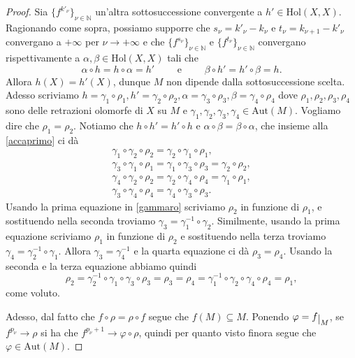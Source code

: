 \begin{proof}
    Sia $\{f^{k'_\nu}\}_{\nu\in\mathbb{N}}$ un'altra sottosuccessione convergente a $h'\in\text{Hol}(X,X)$. Ragionando come sopra, possiamo supporre che $s_\nu=k'_\nu-k_\nu$ e $t_\nu=k_{\nu+1}-k'_\nu$ convergano a $+\infty$ per $\nu\longrightarrow+\infty$ e che $\{f^{s_\nu}\}_{\nu\in\mathbb{N}}$ e $\{f^{t_\nu}\}_{\nu\in\mathbb{N}}$ convergano rispettivamente a $\alpha,\beta \in \text{Hol}(X,X)$ tali che
    \begin{equation}\label{accaprimo}
        \alpha\circ h=h\circ\alpha=h' \qquad\text{ e }\qquad \beta\circ h'=h'\circ\beta=h.
    \end{equation}
    Allora $h(X)=h'(X)$, dunque $M$ non dipende dalla sottosuccessione scelta. Adesso scriviamo $h=\gamma_1\circ\rho_1,h'=\gamma_2\circ\rho_2,\alpha=\gamma_3\circ\rho_3,\beta=\gamma_4\circ\rho_4$ dove $\rho_1,\rho_2,\rho_3,\rho_4$ sono delle retrazioni olomorfe di $X$ su $M$ e $\gamma_1,\gamma_2,\gamma_3,\gamma_4\in\text{Aut}(M)$. Vogliamo dire che $\rho_1=\rho_2$. Notiamo che $h\circ h'=h'\circ h$ e $\alpha\circ\beta=\beta\circ\alpha$, che insieme alla \eqref{accaprimo} ci dà
    \begin{equation}\label{gammaro}\begin{split}
        \gamma_1\circ\gamma_2\circ\rho_2=\gamma_2\circ\gamma_1\circ\rho_1,\\
        \gamma_3\circ\gamma_1\circ\rho_1=\gamma_1\circ\gamma_3\circ\rho_3=\gamma_2\circ\rho_2,\\
        \gamma_4\circ\gamma_2\circ\rho_2=\gamma_2\circ\gamma_4\circ\rho_4=\gamma_1\circ\rho_1,\\
        \gamma_3\circ\gamma_4\circ\rho_4=\gamma_4\circ\gamma_3\circ\rho_3.
    \end{split}\end{equation}
    Usando la prima equazione in \eqref{gammaro} scriviamo $\rho_2$ in funzione di $\rho_1$, e sostituendo nella seconda troviamo $\gamma_3=\gamma_1^{-1}\circ\gamma_2$. Similmente, usando la prima equazione scriviamo $\rho_1$ in funzione di $\rho_2$ e sostituendo nella terza troviamo $\gamma_4=\gamma_2^{-1}\circ\gamma_1$. Allora $\gamma_3=\gamma_4^{-1}$ e la quarta equazione ci dà $\rho_3=\rho_4$. Usando la seconda e la terza equazione abbiamo quindi
    $$\rho_2=\gamma_2^{-1}\circ\gamma_1\circ\gamma_3\circ\rho_3=\rho_3=\rho_4=\gamma_1^{-1}\circ\gamma_2\circ\gamma_4\circ\rho_4=\rho_1,$$
    come voluto.

    Adesso, dal fatto che $f\circ\rho=\rho\circ f$ segue che $f(M)\subseteq M$. Ponendo $\varphi=f\restrict{M}$, se $f^{p_\nu}\longrightarrow\rho$ si ha che $f^{p_\nu+1}\longrightarrow\varphi\circ\rho$, quindi per quanto visto finora segue che $\varphi\in\text{Aut}(M)$.


\end{proof}
